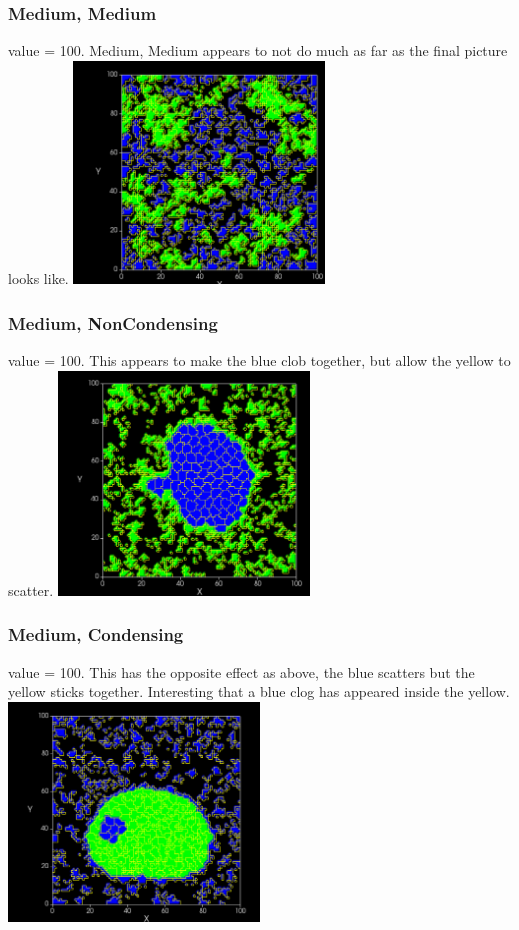 \documentclass{article}
\begin{document}
\subsubsection{Medium, Medium}
value = 100.  Medium, Medium appears to not do much as far as the final picture looks like.
    {\centering\includegraphics[width=0.5\textwidth]{medium_medium100}}
    
\subsubsection{Medium, NonCondensing}
value = 100. This appears to make the blue clob together, but allow the yellow to scatter.  
\includegraphics[width=0.5\textwidth]{medium_nonceondensing100}

\subsubsection{Medium, Condensing}
value = 100. This has the opposite effect as above, the blue scatters but the yellow sticks together.  Interesting that a blue clog has appeared inside the yellow.
    \includegraphics[width=0.5\textwidth]{medium_condensing100}
\end{document}
